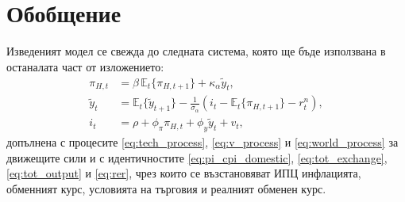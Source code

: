 \section{Обобщение}

Изведеният модел се свежда до следната система, която ще бъде използвана в останалата част от изложението:
\begin{align}
\pi_{H,t} &= \beta\, \mathbb{E}_t\{ \pi_{H,t+1} \} + \kappa_\alpha \tilde{y}_t, \tag{НККФ} \\
\tilde{y}_t &= \mathbb{E}_t\{ \tilde{y}_{t+1} \} - \frac{1}{\sigma_\alpha} \left( i_t - \mathbb{E}_t\{ \pi_{H,t+1} \} - r^n_t \right), \tag{ДИС} \\
i_t &= \rho + \phi_\pi \pi_{H,t} + \phi_y \tilde{y}_t + v_t, \tag{ПТ}
\end{align}
допълнена с процесите \eqref{eq:tech_process}, \eqref{eq:v_process} и \eqref{eq:world_process} за движещите сили и с идентичностите \eqref{eq:pi_cpi_domestic}, \eqref{eq:tot_exchange}, \eqref{eq:tot_output} и \eqref{eq:rer}, чрез които се възстановяват ИПЦ инфлацията, обменният курс, условията на търговия и реалният обменен курс.